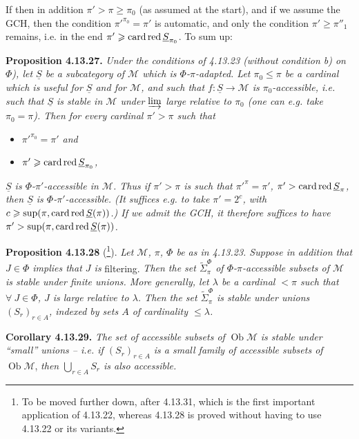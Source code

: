 \documentclass[11pt]{article}
\newcommand{\msp}[1]{\marginpar{\footnotesize [#1]}}
\newcommand{\Ob}{\operatorname{Ob}}
\newcommand{\cardred}{\mathop{\textup{card\,red}}\nolimits}
\begin{document}
\msp{page 348}
If then in addition $\pi'>\pi\geqslant\pi_0$ (as assumed at the start), and if we assume the GCH, then the condition $\pi'^{\pi_0}=\pi'$ is automatic, and only the condition $\pi'\geqslant\pi''_1$ remains, i.e. in the end $\pi'\geqslant\cardred\underline{S}_{\pi_0}$. To sum up:

\textbf{Proposition 4.13.27.} \textit{Under the conditions of 4.13.23 (without condition b) on $\Phi$), let $\underline{S}$ be a subcategory of $\mathcal{M}$ which is $\Phi$-$\pi$-adapted. Let $\pi_0\leqslant\pi$ be a cardinal which is useful for $\underline{S}$ and for $\mathcal{M}$, and such that $f:\underline{S}\longrightarrow\mathcal{M}$ is $\pi_0$-accessible, i.e. such that $\underline{S}$ is stable in $\mathcal{M}$ under $\varinjlim$ large relative to $\pi_0$ (one can e.g. take $\pi_0=\pi$). Then for every cardinal $\pi'>\pi$ such that}
\begin{itemize}[leftmargin=2.5em]
\item[\textit{a)}] \textit{$\pi'^{\pi_0}=\pi'$ and}
\item[\textit{b)}] \textit{$\pi'\geqslant\cardred\underline{S}_{\pi_0}$,}
\end{itemize}
\textit{$\underline{S}$ is $\Phi$-$\pi'$-accessible in $\mathcal{M}$. Thus if $\pi'>\pi$ is such that $\pi'^{\pi}=\pi'$, $\pi'>\cardred\underline{S}_\pi$, then $\underline{S}$ is $\Phi$-$\pi'$-accessible. (It suffices e.g. to take $\pi'=2^c$, with $c\geqslant\sup(\pi,\cardred\underline{S}(\pi))$.) If we admit the GCH, it therefore suffices to have $\pi'>\sup(\pi,\cardred\underline{S}(\pi))$.}

\msp{page 349}
\textbf{Proposition 4.13.28} (\footnote{To be moved further down, after 4.13.31, which is the first important application of 4.13.22, whereas 4.13.28 is proved without having to use 4.13.22 or its variants.}). \textit{Let $\mathcal{M}$, $\pi$, $\Phi$ be as in 4.13.23. Suppose in addition that $J\in\Phi$ implies that $J$ is} filtering. \textit{Then the set $\tilde{\Sigma}^{\Phi}_{\pi}$ of $\Phi$-$\pi$-accessible subsets of $\mathcal{M}$ is stable under finite unions. More generally, let $\lambda$ be a cardinal $<\pi$ such that $\forall\ J\in\Phi$, $J$ is large relative to $\lambda$. Then the set $\tilde{\Sigma}^{\Phi}_{\pi}$ is stable under unions $(S_r)_{r\in A}$, indexed by sets $A$ of cardinality $\leqslant\lambda$.}

\textbf{Corollary 4.13.29.} \textit{The set of accessible subsets of} $\Ob\mathcal{M}$ \textit{is stable under ``small'' unions -- i.e. if $(S_r)_{r\in A}$ is a small family of accessible subsets of} $\Ob\mathcal{M}$, \textit{then $\bigcup_{r\in A}S_r$ is also accessible.}
\end{document}
